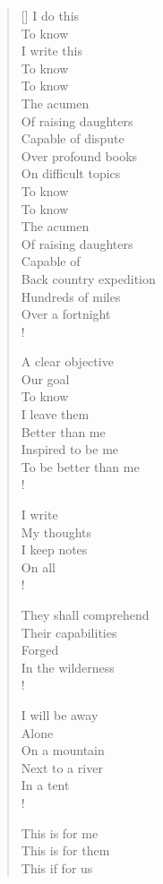 \documentclass[11pt, a4paper]{article}
\newcommand{\poemauthorright}[1]{\nopagebreak{\raggedleft\footnotesize\textsc{#1}\par}} %
\begin{document}
\begin{verse}[\versewidth]
I do this \\
To know \\
I write this \\ 
To know \\
To know  \\
The acumen  \\
Of raising daughters \\
Capable of dispute  \\
Over profound books \\
On difficult topics  \\
To know  \\
To know \\
The acumen \\
Of raising daughters  \\
Capable of  \\
Back country expedition \\
Hundreds of miles \\
Over a fortnight \\!

A clear objective \\
Our goal \\
To know \\
I leave them \\
Better than me  \\
Inspired to be me \\
To be better than me \\!

I write \\
My thoughts \\
I keep notes \\
On all \\!

They shall comprehend \\
Their capabilities \\
Forged  \\
In the wilderness \\!

I will be away \\
Alone \\
On a mountain \\
Next to a river \\
In a tent \\!

This is for me \\
This is for them \\
This if for us

\end{verse}


\poemauthorright{J. Theriot} %
\end{document}
